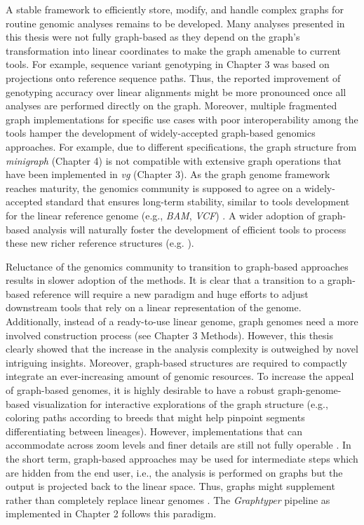 \documentclass[../main.tex]{subfiles}
\begin{document}
A stable framework to efficiently store, modify, and handle complex graphs for routine genomic analyses remains to be developed. Many analyses presented in this thesis were not fully graph-based as they depend on the graph’s transformation into linear coordinates to make the graph amenable to current tools. For example, sequence variant genotyping in Chapter 3 was based on projections onto reference sequence paths. Thus, the reported improvement of genotyping accuracy over linear alignments might be more pronounced once all analyses are performed directly on the graph. Moreover, multiple fragmented graph implementations for specific use cases with poor interoperability among the tools hamper the development of widely-accepted graph-based genomics approaches. For example, due to different specifications, the graph structure from \emph{minigraph} (Chapter 4) is not compatible with extensive graph operations that have been implemented in \emph{vg} (Chapter 3). As the graph genome framework reaches maturity, the genomics community is supposed to agree on a widely-accepted standard that ensures long-term stability, similar to  tools development for the linear reference genome (e.g., \emph{BAM}, \emph{VCF}) \citep{bonfield2021htslib}. A wider adoption of graph-based analysis will naturally foster the development of efficient tools to process these new richer reference structures (e.g. \citep{qiu2021constructing,schulz2020detecting}).

Reluctance of the genomics community to transition to graph-based approaches results in slower adoption of the methods. It is clear that a transition to a graph-based reference will require a new paradigm and huge efforts to adjust downstream tools that rely on a linear representation of the genome. Additionally, instead of a ready-to-use linear genome, graph genomes need a more involved construction process (see Chapter 3 Methods). However, this thesis clearly showed that the increase in the analysis complexity is outweighed by novel intriguing insights. Moreover, graph-based structures are required to compactly integrate an ever-increasing amount of genomic resources. To increase the appeal of graph-based genomes, it is highly desirable to have a robust graph-genome-based visualization for interactive explorations of the graph structure (e.g., coloring paths according to breeds that might help pinpoint segments differentiating between lineages). However, implementations that can accommodate across zoom levels and finer details are still not fully operable \citep{yokoyama2019momi,beyer2019sequence,eizenga2020pangenome}. In the short term, graph-based approaches may be used for intermediate steps which are hidden from the end user, i.e., the analysis is performed on graphs but the output is projected back to the linear space. Thus, graphs might supplement rather than completely replace linear genomes \citep{kim2019graph,grytten2020assessing,li2020design,siren2020genotyping}. The \emph{Graphtyper} pipeline as implemented in Chapter 2 follows this paradigm. 
\end{document}
